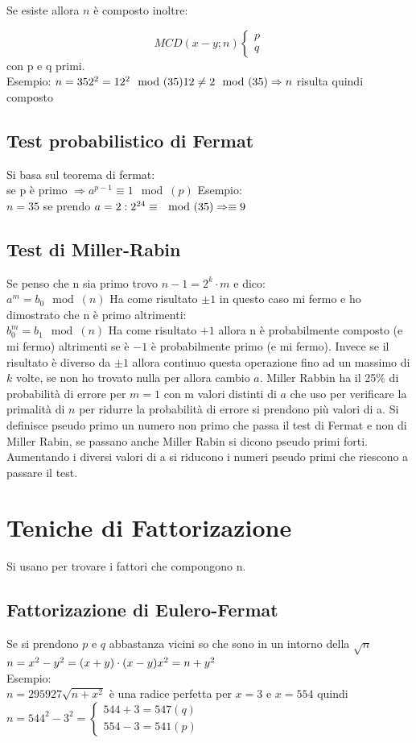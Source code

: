 \documentclass[10pt,a4paper]{article}
\begin{document}
Se esiste allora $n$ è composto inoltre:

$$MCD(x-y;n)
\begin{cases}
p\\q
\end{cases}
$$
con p e q primi.\\
Esempio:
$n=35\\
2^2=12^2 \mod(35)\\
12 \not = 2 \mod(35) \Rightarrow n$ risulta quindi composto\\

\subsection{Test probabilistico di Fermat}
Si basa sul teorema di fermat:\\
se p è primo $\Rightarrow a^{p-1}\equiv 1 \mod(p)$
Esempio:\\
$n=35$ se prendo $a=2:\\
2^{24}\equiv \mod(35) \Rightarrow \equiv 9
$
\subsection{Test di Miller-Rabin}
Se penso che n sia primo trovo $n-1=2^k\cdot m$ e dico:\\
$a^m=b_0 \mod(n)$ Ha come risultato $ \pm 1$ in questo caso mi fermo e ho dimostrato che n è primo altrimenti:\\
$b_0^m=b_1 \mod(n)$ Ha come risultato $+1$ allora n è probabilmente composto (e mi fermo) altrimenti se è $-1$ è probabilmente primo (e mi fermo). Invece se il risultato è diverso da $\pm 1$ allora continuo questa operazione fino ad un massimo di $k$ volte, se non ho trovato nulla per allora cambio $a$. Miller Rabbin ha il 25\% di probabilità di errore per $m=1$ con m valori distinti di $a$ che uso per verificare la primalità di $n$ per ridurre la probabilità di errore si prendono più valori di a. Si definisce pseudo primo un numero non primo che passa il test di Fermat e non di Miller Rabin, se passano anche Miller Rabin si dicono pseudo primi forti. Aumentando i diversi valori di a si riducono i numeri pseudo primi che riescono a passare il test.
\section{Teniche di Fattorizazione}
Si usano per trovare i fattori che compongono n.
\subsection{Fattorizazione di Eulero-Fermat}
Se si prendono $p$ e $q$ abbastanza vicini so che sono in un intorno della $\sqrt{n}$
$n=x^2-y^2=(x+y)\cdot(x-y)\\x^2=n+y^2$\\
Esempio:\\
$n=295927 \sqrt{n+x^2}$ è una radice perfetta per $x=3$ e $x=554$ quindi
$n=544^2-3^2=\begin{cases}
544+3 = 547 (q)\\
554-3 = 541 (p)
\end{cases}
$
\end{document}
